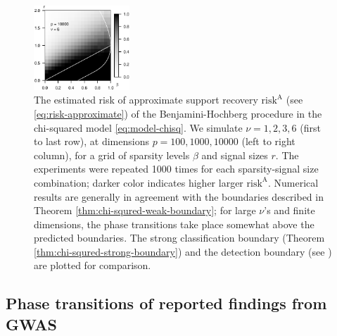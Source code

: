 \begin{figure}
      \includegraphics[width=0.32\textwidth]{./sim_weak_boundary/simulated_weak_boundary_chi-squared_nu6_p10000.eps}
      \caption{The estimated risk of approximate support recovery $\mathrm{risk}^{\mathrm{A}}$ (see \eqref{eq:risk-approximate}) of the Benjamini-Hochberg procedure in the chi-squared model \eqref{eq:model-chisq}. 
      We simulate $\nu=1, 2, 3, 6$ (first to last row), at dimensions $p=100, 1000, 10000$ (left to right column), for a grid of sparsity levels $\beta$ and signal sizes $r$.
      The experiments were repeated 1000 times for each sparsity-signal size combination; darker color indicates higher larger $\mathrm{risk}^{\mathrm{A}}$. 
      Numerical results are generally in agreement with the boundaries described in Theorem \ref{thm:chi-squred-weak-boundary}; for large $\nu$'s and finite dimensions, the phase transitions take place somewhat above the predicted boundaries.
      The strong classification boundary (Theorem \ref{thm:chi-squred-strong-boundary}) and the detection boundary (see \citep{donoho2004higher}) are plotted for comparison.} 
      \label{fig:phase-simulated-chi-squared-weak-boundary}
\end{figure}



\subsection{Phase transitions of reported findings from GWAS}